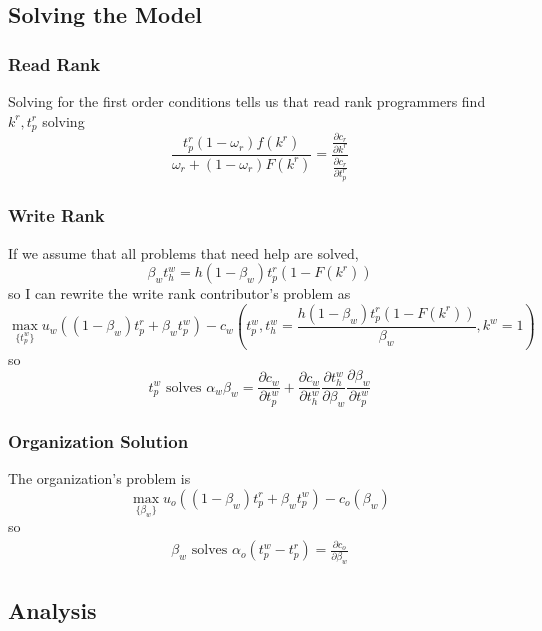 \documentclass[../main.tex]{subfiles}
\begin{document}
\subsection{Solving the Model}
\subsubsection{Read Rank}
Solving for the first order conditions tells us that read rank programmers find $k^r, t_p^r$ solving 
$$\frac{t_p^r(1-\omega_r)f(k^r)}{\omega_r + (1-\omega_r) F(k^r)} = \frac{\frac{\partial c_r}{\partial k^r}}{\frac{\partial c_r}{\partial t_p^r}}$$
\subsubsection{Write Rank}
If we assume that all problems that need help are solved, $$\beta_w t_h^w = h(1-\beta_w) t_p^r (1-F(k^r))$$ so I can rewrite the write rank contributor's problem as
$$\max_{\{t_p^w\}} u_w\left((1-\beta_w) t_p^r + \beta_w t_p^w \right) - c_w\left(t_p^w, t_h^w = \frac{ h (1-\beta_w) t_p^r(1-F(k^r))}{\beta_w}, k^w = 1\right)$$
so $$t_p^w \text{ solves } \alpha_w \beta_w = \frac{\partial c_w}{\partial t_p^w} + \frac{\partial c_w}{\partial t_h^w}\frac{\partial t_h^w}{\partial \beta_w}\frac{\partial \beta_w}{\partial t_p^w}$$

\subsubsection{Organization Solution}
The organization's problem is 
$$\max_{\{\beta_w\}} u_o\left((1-\beta_w) t_p^r + \beta_w t_p^w\right) - c_o(\beta_w)$$ 
so 
\begin{align}
    \beta_w \text{ solves } \alpha_o (t_p^w - t_p^r) = \frac{\partial c_o}{\partial \beta_w} \label{org_solution}
\end{align}
\subsection{Analysis}
\end{document}
